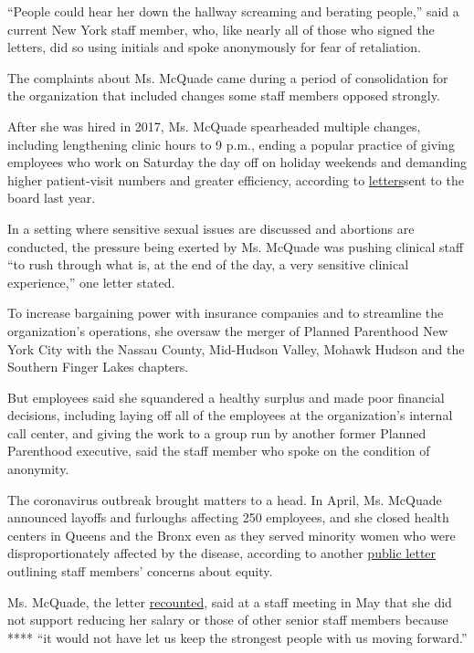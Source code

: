 ``People could hear her down the hallway screaming and berating
people,'' said a current New York staff member, who, like nearly all of
those who signed the letters, did so using initials and spoke
anonymously for fear of retaliation.

The complaints about Ms. McQuade came during a period of consolidation
for the organization that included changes some staff members opposed
strongly.

After she was hired in 2017, Ms. McQuade spearheaded multiple changes,
including lengthening clinic hours to 9 p.m., ending a popular practice
of giving employees who work on Saturday the day off on holiday weekends
and demanding higher patient-visit numbers and greater efficiency,
according to
\href{https://saveppgny.files.wordpress.com/2020/06/march-2019-staff-to-board.pdf}{letters}sent
to the board last year.

In a setting where sensitive sexual issues are discussed and abortions
are conducted, the pressure being exerted by Ms. McQuade was pushing
clinical staff ``to rush through what is, at the end of the day, a very
sensitive clinical experience,'' one letter stated.

To increase bargaining power with insurance companies and to streamline
the organization's operations, she oversaw the merger of Planned
Parenthood New York City with the Nassau County, Mid-Hudson Valley,
Mohawk Hudson and the Southern Finger Lakes chapters.

But employees said she squandered a healthy surplus and made poor
financial decisions, including laying off all of the employees at the
organization's internal call center, and giving the work to a group run
by another former Planned Parenthood executive, said the staff member
who spoke on the condition of anonymity.

The coronavirus outbreak brought matters to a head. In April, Ms.
McQuade announced layoffs and furloughs affecting 250 employees, and she
closed health centers in Queens and the Bronx even as they served
minority women who were disproportionately affected by the disease,
according to another
\href{https://saveppgny.wordpress.com/equity/}{public letter} outlining
staff members' concerns about equity.

Ms. McQuade, the letter
\href{https://saveppgny.wordpress.com/}{recounted}, said at a staff
meeting in May that she did not support reducing her salary or those of
other senior staff members because **** ``it would not have let us keep
the strongest people with us moving forward.''

